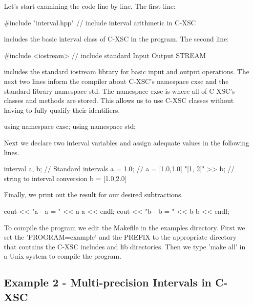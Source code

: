 \-Let's start examining the code line by line. \-The first line\-:


\begin{DoxyCodeInclude}
#include "interval.hpp"  // include interval arithmetic in C-XSC

\end{DoxyCodeInclude}


includes the basic interval class of \-C-\/\-X\-S\-C in the program. \-The second line\-:


\begin{DoxyCodeInclude}
#include <iostream>      // include standard Input Output STREAM 

\end{DoxyCodeInclude}


includes the standard iostream library for basic input and output operations. \-The next two lines inform the compiler about \-C-\/\-X\-S\-C's namespace cxsc and the standard library namespace std. \-The namespace cxsc is where all of \-C-\/\-X\-S\-C's classes and methods are stored. \-This allows us to use \-C-\/\-X\-S\-C classes without having to fully qualify their identifiers.


\begin{DoxyCodeInclude}
using namespace cxsc;    
using namespace std;

\end{DoxyCodeInclude}


\-Next we declare two interval variables and assign adequate values in the following lines.


\begin{DoxyCodeInclude}
  interval a, b;            // Standard intervals     
  a = 1.0;                  // a   = [1.0,1.0]       
  "[1, 2]" >> b;          // string to interval conversion b   = [1.0,2.0]     
         

\end{DoxyCodeInclude}


\-Finally, we print out the result for our desired subtractions.


\begin{DoxyCodeInclude}
  cout << "a - a = " << a-a << endl;
  cout << "b - b = " << b-b << endl;

\end{DoxyCodeInclude}


\-To compile the program we edit the \-Makefile in the examples directory. \-First we set the '\-P\-R\-O\-G\-R\-A\-M=example' and the \-P\-R\-E\-F\-I\-X to the appropriate directory that contains the \-C-\/\-X\-S\-C includes and lib directories. \-Then we type 'make all' in a \-Unix system to compile the program.\hypertarget{cxscexamples_cxscexamples_sec_ex2}{}\subsection{\-Example 2 -\/ Multi-\/precision Intervals in C-\/\-X\-S\-C}\label{cxscexamples_cxscexamples_sec_ex2}



